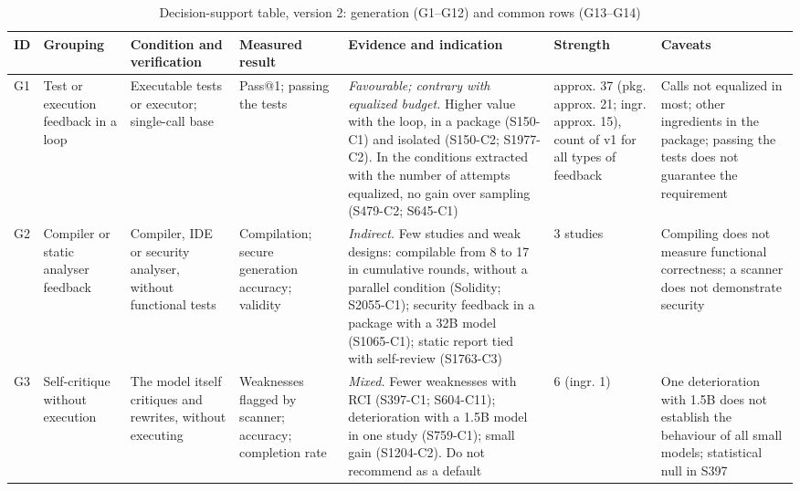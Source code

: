 \providecommand*{\rr}{\raggedright\hspace{0pt}}
\begin{table}[!tp]
\caption{Decision-support table, version 2: generation (G1--G12) and common rows (G13--G14)}\label{tab:apoio}
\centering
\fontsize{6.6}{7.4}\selectfont
\renewcommand{\arraystretch}{0.95}
\setlength{\tabcolsep}{2.5pt}
\renewcommand*{\rr}{\raggedright\hspace{0pt}}
\begin{tabular}{p{0.55cm}p{2.0cm}p{2.4cm}p{1.9cm}p{5.6cm}p{1.6cm}p{3.1cm}}
\hline
\rr\textbf{ID} & \rr\textbf{Grouping} & \rr\textbf{Condition and verification} & \rr\textbf{Measured result} & \rr\textbf{Evidence and indication} & \rr\textbf{Strength} & \rr\textbf{Caveats}\tabularnewline
\hline
\rr G1 & \rr Test or execution feedback in a loop & \rr Executable tests or executor; single-call base & \rr Pass@1; passing the tests & \rr \textit{Favourable; contrary with equalized budget.} Higher value with the loop, in a package (S150-C1) and isolated (S150-C2; S1977-C2). In the conditions extracted with the number of attempts equalized, no gain over sampling (S479-C2; S645-C1) & \rr approx. 37 (pkg. approx. 21; ingr. approx. 15), count of v1 for all types of feedback & \rr Calls not equalized in most; other ingredients in the package; passing the tests does not guarantee the requirement\tabularnewline
\rr G2 & \rr Compiler or static analyser feedback & \rr Compiler, IDE or security analyser, without functional tests & \rr Compilation; secure generation accuracy; validity & \rr \textit{Indirect.} Few studies and weak designs: compilable from 8 to 17 in cumulative rounds, without a parallel condition (Solidity; S2055-C1); security feedback in a package with a 32B model (S1065-C1); static report tied with self-review (S1763-C3) & \rr 3 studies & \rr Compiling does not measure functional correctness; a scanner does not demonstrate security\tabularnewline
\rr G3 & \rr Self-critique without execution & \rr The model itself critiques and rewrites, without executing & \rr Weaknesses flagged by scanner; accuracy; completion rate & \rr \textit{Mixed.} Fewer weaknesses with RCI (S397-C1; S604-C11); deterioration with a 1.5B model in one study (S759-C1); small gain (S1204-C2). Do not recommend as a default & \rr 6 (ingr. 1) & \rr One deterioration with 1.5B does not establish the behaviour of all small models; statistical null in S397\tabularnewline

\end{tabular}
\end{table}
